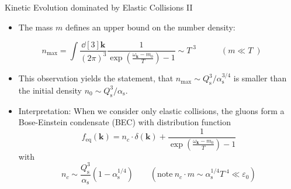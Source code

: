 \begin{frame}{Kinetic Evolution dominated by Elastic Collisions II}
\begin{itemize}
	\item The mass $m$ defines an upper bound on the number density:
\end{itemize}
\begin{equation}
	n_{\mathrm{max}} = \int\frac{\dd[3]\mathbf{k}}{(2\pi)^3}\frac{1}{\exp\left(\frac{\omega_{\mathbf{k}}-m_0}{T}\right)-1}\sim T^{\phantom{.}3} \quad\qquad (m\ll T\phantom{.})
\end{equation}
\begin{itemize}
	\item This observation yields the statement, that $n_{\mathrm{max}} \sim Q_{\mathrm{s}}^3/\alpha_{\mathrm{s}}^{3/4}$ is smaller than the initial density  $n_0 \sim Q_{\mathrm{s}}^3/\alpha_{\mathrm{s}}$.
	\item \alert{Interpretation:} When we consider only elastic collisions, the gluons form a \alert{Bose-Einstein condensate} (BEC) with distribution function
\begin{equation}
	f_{\mathrm{eq}}(\mathbf{k}) = n_c\cdot\delta(\mathbf{k}) + \frac{1}{\exp\left(\frac{\omega_{\mathbf{k}}-m_0}{T}\right)-1}
\end{equation}
	with 
	\begin{equation}
	 n_c \sim  \frac{Q_{\mathrm{s}}^3}{\alpha_{\mathrm{s}}}\left(1-\alpha_{\mathrm{s}}^{1/4}\right)  \qquad (\text{note}\ n_c\cdot m \sim \alpha_{\mathrm{s}}^{1/4}T^{\phantom{.}4} \ll \varepsilon_0)
\end{equation}
\end{itemize}
\end{frame}

